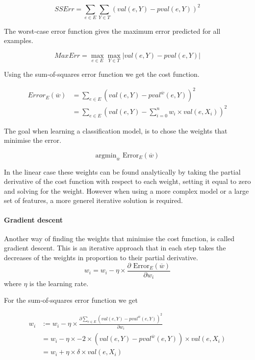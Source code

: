 \[ SSErr = \sum_{e \in E}\sum_{Y \in T} (val(e,Y) - pval(e,Y))^2 \]

The worst-case error function gives the maximum error predicted for all examples.

\[ MaxErr = \max_{e \in E}\max_{Y \in T} | val(e,Y) - pval(e,Y) | \]

\begin{flushright}
\cite[p. 290-291]{AI2010}
\end{flushright}

Using the sum-of-squares error function we get the cost function.

\begin{align*}
Error_E(\overline{w}) &= \sum_{e \in E} \left(val(e,Y)-pval^{\overline{w}}(e,Y)\right)^2 \\
&= \sum_{e \in E} \left(val(e,Y)-\sum_{i=0}^n w_i \times val(e,X_i)\right)^2
\end{align*}

The goal when learning a classification model, is to chose the weights that minimise the error.

\[ \text{argmin}_{\overline{w}} \text{ Error}_E(\overline{w}) \]

In the linear case these weights can be found analytically by taking the partial derivative of the cost function with respect 
to each weight, setting it equal to zero and solving for the weight.
However when using a more complex model or a large set of features, a more generel iterative solution is required.

\paragraph{Gradient descent}

Another way of finding the weights that minimise the cost function, is called gradient descent.
This is an iterative approach that in each step takes the decreases of the weights in
proportion to their partial derivative.
\[ w_i = w_i - \eta \times \frac{\partial \text{ Error}_E(\overline{w})}{\partial w_i} \]
where $\eta$ is the learning rate.

For the sum-of-squares error function we get

\begin{align*}
w_i &:= w_i - \eta \times \frac{\partial \sum_{e \in E}\left(val(e,Y) - pval^{\overline{w}}(e,Y)\right)^2}{\partial w_i} \\ %
&= w_i - \eta \times -2 \times \left(val(e,Y) - pval^{\overline{w}}(e,Y)\right) \times val(e,X_i) \\
&= w_i + \eta \times \delta \times val(e,X_i)
\end{align*}

